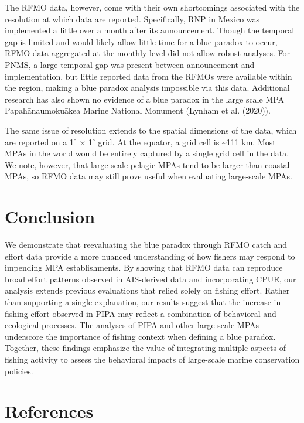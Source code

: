 \documentclass[
  letterpaper,
  DIV=11,
  numbers=noendperiod]{scrartcl}
\begin{document}
The RFMO data, however, come with their own shortcomings associated with
the resolution at which data are reported. Specifically, RNP in Mexico
was implemented a little over a month after its announcement. Though the
temporal gap is limited and would likely allow little time for a blue
paradox to occur, RFMO data aggregated at the monthly level did not
allow robust analyses. For PNMS, a large temporal gap was present
between announcement and implementation, but little reported data from
the RFMOs were available within the region, making a blue paradox
analysis impossible via this data. Additional research has also shown no
evidence of a blue paradox in the large scale MPA Papahānaumokuākea
Marine National Monument (Lynham et al. (2020)).

The same issue of resolution extends to the spatial dimensions of the
data, which are reported on a 1\(^\circ\) × 1\(^\circ\) grid. At the
equator, a grid cell is \textasciitilde111 km. Most MPAs in the world
would be entirely captured by a single grid cell in the data. We note,
however, that large-scale pelagic MPAs tend to be larger than coastal
MPAs, so RFMO data may still prove useful when evaluating large-scale
MPAs.

\section{Conclusion}\label{conclusion}

We demonstrate that reevaluating the blue paradox through RFMO catch and
effort data provide a more nuanced understanding of how fishers may
respond to impending MPA establishments. By showing that RFMO data can
reproduce broad effort patterns observed in AIS-derived data and
incorporating CPUE, our analysis extends previous evaluations that
relied solely on fishing effort. Rather than supporting a single
explanation, our results suggest that the increase in fishing effort
observed in PIPA may reflect a combination of behavioral and ecological
processes. The analyses of PIPA and other large-scale MPAs underscore
the importance of fishing context when defining a blue paradox.
Together, these findings emphasize the value of integrating multiple
aspects of fishing activity to assess the behavioral impacts of
large-scale marine conservation policies.

\section{References}\label{references}
\end{document}
